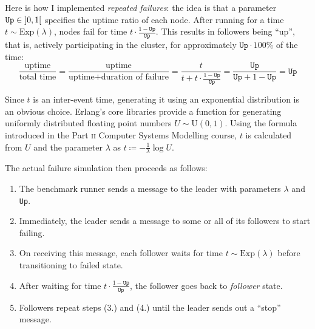 \documentclass[12pt,chapterprefix=true,toc=bibliography,numbers=noendperiod,
               footnotes=multiple,twoside]{scrreprt}
\DeclarePairedDelimiter{\oiv}{]}{[}
\begin{document}

Here is how I implemented \label{repeated-failures} \emph{repeated failures}: the idea is that a parameter \(\texttt{Up} \in \oiv{0,1}\) specifies the uptime ratio of each node. After running for a time \(t \sim \text{Exp}(\lambda)\), nodes fail for time \(t \cdot \frac{1 - \texttt{Up}}{\texttt{Up}}\). This results in followers being \enquote{up}, that is, actively participating in the cluster, for approximately \(\texttt{Up} \cdot 100\%\) of the time:
\[ \frac{\text{uptime}}{\text{total time}}
 = \frac{\text{uptime}}{\text{uptime} + \text{duration of failure}}
 = \frac{t}{t + t \cdot \frac{1-\texttt{Up}}{\texttt{Up}}}
 = \frac{\texttt{Up}}{\texttt{Up} + 1 - \texttt{Up}} = \texttt{Up} \]

Since \(t\) is an inter-event time, generating it using an exponential distribution is an obvious choice. Erlang's core libraries provide a function for generating uniformly distributed floating point numbers \(U \sim \text{U}(0,1)\). Using the formula introduced in the Part \textsc{ii} Computer Systems Modelling course, \(t\) is calculated from \(U\) and the parameter \(\lambda\) as \(t \coloneqq -\frac{1}{\lambda}\log{U}\).

The actual failure simulation then proceeds as follows:
\begin{enumerate}
    \item The benchmark runner sends a message to the leader with parameters \(\lambda\) and \texttt{Up}.
    \item Immediately, the leader sends a message to some or all of its followers to start failing.
    \item On receiving this message, each follower waits for time \(t \sim \text{Exp}(\lambda)\) before transitioning to failed state.
    \item After waiting for time \(t \cdot \frac{1 - \texttt{Up}}{\texttt{Up}}\), the follower goes back to \textit{follower} state.
    \item Followers repeat steps (3.) and (4.) until the leader sends out a \enquote{stop} message.
\end{enumerate}
\end{document}
